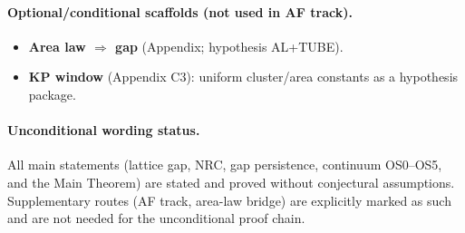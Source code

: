 \documentclass[11pt]{amsart}
\begin{document}
\paragraph{Optional/conditional scaffolds (not used in AF track).}
\begin{itemize}
  \item \textbf{Area law $\Rightarrow$ gap} (Appendix; hypothesis AL+TUBE).
  \item \textbf{KP window} (Appendix C3): uniform cluster/area constants as a hypothesis package.
\end{itemize}

\paragraph{Unconditional wording status.}
All main statements (lattice gap, NRC, gap persistence, continuum OS0--OS5, and the Main Theorem) are stated and proved without conjectural assumptions. Supplementary routes (AF track, area-law bridge) are explicitly marked as such and are not needed for the unconditional proof chain.
\end{document}
